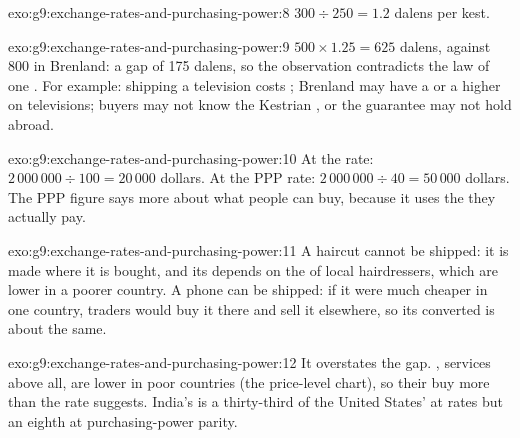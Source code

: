 \begin{solution}{exo:g9:exchange-rates-and-purchasing-power:8}
$300 \div 250 = 1.2$ dalens per kest.
\end{solution}

\begin{solution}{exo:g9:exchange-rates-and-purchasing-power:9}
$500 \times 1.25 = 625$ dalens, against 800 in Brenland: a gap of 175 dalens, so the observation contradicts
the law of one . For example: shipping a television costs ; Brenland may have a  or a
higher  on televisions; buyers may not know the Kestrian , or the guarantee may not hold abroad.
\end{solution}

\begin{solution}{exo:g9:exchange-rates-and-purchasing-power:10}
At the  rate: $2\,000\,000 \div 100 = 20\,000$ dollars. At the PPP rate: $2\,000\,000 \div 40 =
50\,000$ dollars. The PPP figure says more about what people can buy, because it uses the  they
actually pay.
\end{solution}

\begin{solution}{exo:g9:exchange-rates-and-purchasing-power:11}
A haircut cannot be shipped: it is made where it is bought, and its  depends on the  of local
hairdressers, which are lower in a poorer country. A phone can be shipped: if it were much cheaper in one
country, traders would buy it there and sell it elsewhere, so its converted  is about the same.
\end{solution}

\begin{solution}{exo:g9:exchange-rates-and-purchasing-power:12}
It overstates the gap. , services above all, are lower in poor countries (the price-level chart), so
their  buy more than the  rate suggests. India's  is a thirty-third of the
United States' at  rates but an eighth at purchasing-power parity.
\end{solution}

